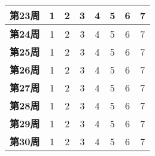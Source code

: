 \begin{table}[H]
\begin{tabular}{|c|c|c|c|c|c|c|c|}
    \textbf{第23周}  & 1 & 2 & 3 & 4 & 5 & 6 & 7 \\ \hline
    \textbf{第24周}  & 1 & 2 & 3 & 4 & 5 & 6 & 7 \\ \hline
    \textbf{第25周}  & 1 & 2 & 3 & 4 & 5 & 6 & 7 \\ \hline
    \textbf{第26周}  & 1 & 2 & 3 & 4 & 5 & 6 & 7 \\ \hline
    \textbf{第27周}  & 1 & 2 & 3 & 4 & 5 & 6 & 7 \\ \hline
    \textbf{第28周}  & 1 & 2 & 3 & 4 & 5 & 6 & 7 \\ \hline
    \textbf{第29周}  & 1 & 2 & 3 & 4 & 5 & 6 & 7 \\ \hline
    \textbf{第30周}  & 1 & 2 & 3 & 4 & 5 & 6 & 7 \\ \hline
    \end{tabular}
\end{table}